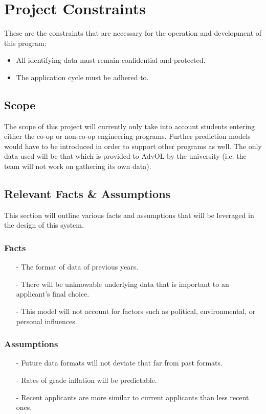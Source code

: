 \documentclass[titlepage]{article}
\begin{document}
\section{Project Constraints}
These are the constraints that are necessary for the operation and development of this program:
\begin{itemize}
	\item All identifying data must remain confidential and protected.
	\item The application cycle must be adhered to.
\end{itemize}
\subsection{Scope}
The scope of this project will currently only take into account students entering either the co-op or non-co-op engineering programs. Further prediction models would have to be introduced in order to support other programs as well. The only data used will be that which is provided to AdvOL by the university (i.e. the team will not work on gathering its own  data).
\subsection{Relevant Facts \& Assumptions}
This section will outline various facts and assumptions that will be leveraged in the design of this system.
\subsubsection{Facts}
\begin{itemize}
	\item[-] The format of data of previous years.
	\item[-] There will be unknowable underlying data that is important to an applicant's final choice.
	\item[-] This model will not account for factors such as political, environmental, or personal influences.
\end{itemize}
\subsubsection{Assumptions}
\begin{itemize}
	\item[-] Future data formats will not deviate that far from past formats.
	\item[-] Rates of grade inflation will be predictable.
	\item[-] Recent applicants are more similar to current applicants than less recent ones.%
\end{itemize}
\end{document}
